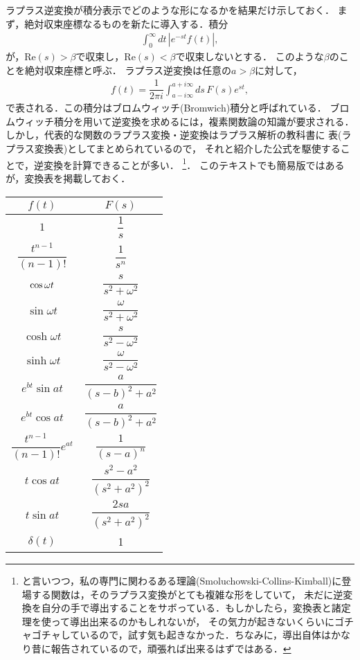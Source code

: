 ラプラス逆変換が積分表示でどのような形になるかを結果だけ示しておく．
まず，絶対収束座標なるものを新たに導入する．積分
\begin{align}
 \int_{0}^{\infty}dt\,\left|e^{-st}f(t)\right|, 
\end{align}
が，$\mathrm{Re}(s)>\beta$で収束し，$\mathrm{Re}(s)<\beta$で収束しないとする．
このような$\beta$のことを絶対収束座標と呼ぶ．
ラプラス逆変換は任意の$a>\beta$に対して，
\begin{align}
 f(t) = \dfrac{1}{2\pi i}\int_{a-i\infty}^{a+i\infty}ds\, F(s)e^{st}, 
\end{align}
で表される．この積分はブロムウィッチ(Bromwich)積分と呼ばれている．
ブロムウィッチ積分を用いて逆変換を求めるには，複素関数論の知識が要求される．
しかし，代表的な関数のラプラス変換・逆変換はラプラス解析の教科書に
表(ラプラス変換表)としてまとめられているので，
それと紹介した公式を駆使することで，逆変換を計算できることが多い．
\footnote{と言いつつ，私の専門に関わるある理論(Smoluchowski-Collins-Kimball)に登場する関数は，そのラプラス変換がとても複雑な形をしていて，
未だに逆変換を自分の手で導出することをサボっている．もしかしたら，変換表と諸定理を使って導出出来るのかもしれないが，
その気力が起きないくらいにゴチャゴチャしているので，試す気も起きなかった．ちなみに，導出自体はかなり昔に報告されているので，頑張れば出来るはずではある．}．
このテキストでも簡易版ではあるが，変換表を掲載しておく．
\begin{table}[htbp]
\centering
\renewcommand{\arraystretch}{1.2}
\begin{tabular}{c|c}
\hline
\hline 
$f\left(t\right)$ & $F\left(s\right)$\tabularnewline
\hline 
$1$ & $\dfrac{1}{s}$\tabularnewline
$\dfrac{t^{n-1}}{\left(n-1\right)!}$ & $\dfrac{1}{s^{n}}$\tabularnewline
$\cos\text{\ensuremath{\omega}}t$ & $\dfrac{s}{s^{2}+\omega^{2}}$\tabularnewline
$\sin\omega t$ & $\dfrac{\omega}{s^{2}+\omega^{2}}$\tabularnewline
$\cosh\omega t$ & $\dfrac{s}{s^{2}-\omega^{2}}$\tabularnewline
$\sinh\omega t$ & $\dfrac{\omega}{s^{2}-\omega^{2}}$\tabularnewline
$e^{bt}\sin at$ & $\dfrac{a}{\left(s-b\right)^{2}+a^{2}}$\tabularnewline
$e^{bt}\cos at$ & $\dfrac{a}{\left(s-b\right)^{2}+a^{2}}$\tabularnewline
$\dfrac{t^{n-1}}{\left(n-1\right)!}e^{at}$ & $\dfrac{1}{\left(s-a\right)^{n}}$\tabularnewline
$t\cos at$ & $\dfrac{s^{2}-a^{2}}{\left(s^{2}+a^{2}\right)^{2}}$\tabularnewline
$t\sin at$ & $\dfrac{2sa}{\left(s^{2}+a^{2}\right)^{2}}$\tabularnewline
$\delta\left(t\right)$ & 1\tabularnewline
\hline 
\end{tabular} 
\end{table}
%
\clearpage

